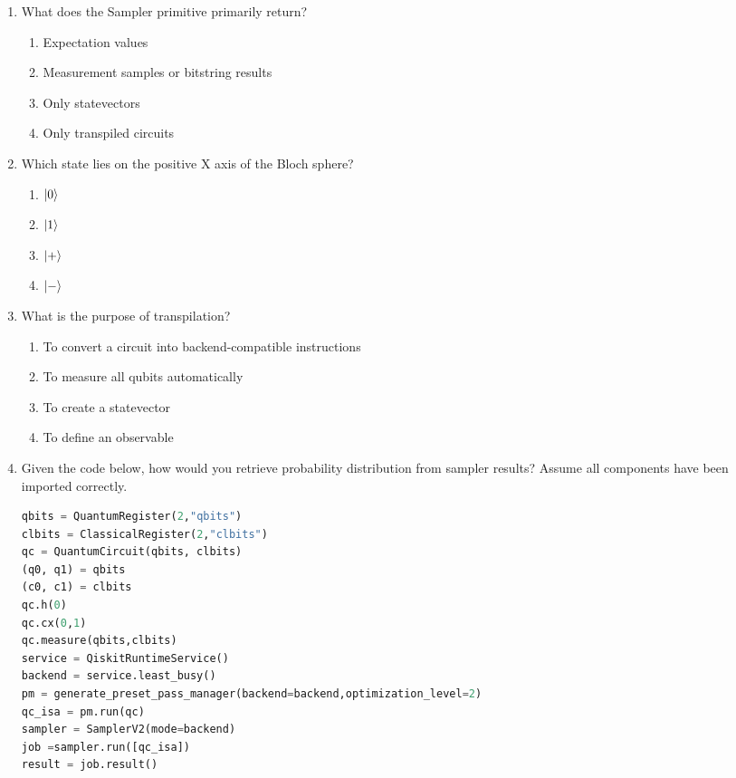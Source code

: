 \documentclass[11pt,a4paper]{article}
\begin{document}
\begin{enumerate}
\begin{enumerate}[label=\Alph*.]
\item When you need bitstring measurement outcomes
\item When you need expectation values of observables
\item When you need to draw a circuit
\item When you need to create a backend
\end{enumerate}

\item What does the Sampler primitive primarily return?

\begin{enumerate}[label=\Alph*.]
\item Expectation values
\item Measurement samples or bitstring results
\item Only statevectors
\item Only transpiled circuits
\end{enumerate}

\item Which state lies on the positive X axis of the Bloch sphere?

\begin{enumerate}[label=\Alph*.]
\item $\ket{0}$
\item $\ket{1}$
\item $\ket{+}$
\item $\ket{-}$
\end{enumerate}

\item What is the purpose of transpilation?

\begin{enumerate}[label=\Alph*.]
\item To convert a circuit into backend-compatible instructions
\item To measure all qubits automatically
\item To create a statevector
\item To define an observable
\end{enumerate}

\item Given the code below, how would you retrieve probability distribution from sampler results? Assume all components have been imported correctly.

\begin{lstlisting}[language=Python]
qbits = QuantumRegister(2,"qbits")
clbits = ClassicalRegister(2,"clbits")
qc = QuantumCircuit(qbits, clbits)
(q0, q1) = qbits
(c0, c1) = clbits
qc.h(0)
qc.cx(0,1)
qc.measure(qbits,clbits)
service = QiskitRuntimeService()
backend = service.least_busy()
pm = generate_preset_pass_manager(backend=backend,optimization_level=2)
qc_isa = pm.run(qc)
sampler = SamplerV2(mode=backend)
job =sampler.run([qc_isa])
result = job.result()


\end{lstlisting}
\end{enumerate}
\end{document}
